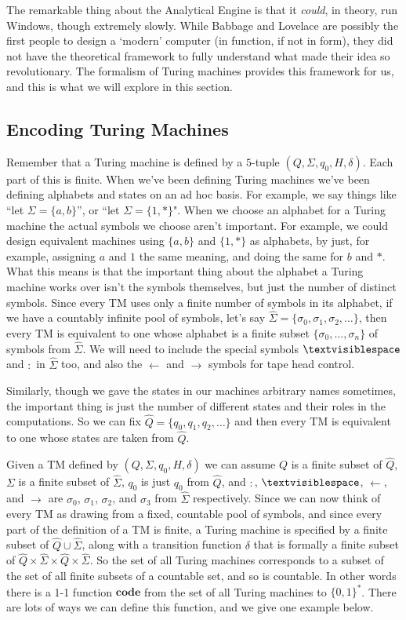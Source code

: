 \documentclass{article}
\theoremstyle{plain}
\theoremstyle{definition}
\newcommand{\tvs}{\textvisiblespace}
\newcommand{\ra}{\rightarrow}
\newcommand{\la}{\leftarrow}
\newcommand{\co}{\mathbf{code}}
\begin{document}
The remarkable thing about the Analytical Engine is that it \emph{could}, in theory, run Windows, though extremely slowly. While Babbage and Lovelace are possibly the first people to design a `modern' computer (in function, if not in form), they did not have the theoretical framework to fully understand what made their idea so revolutionary. The formalism of Turing machines provides this framework for us, and this is what we will explore in this section.  



\subsection{Encoding Turing Machines}
Remember that a Turing machine is defined by a $5$-tuple $(Q,\Sigma,q_0,H,\delta)$. Each part of this is finite. When we've been defining Turing machines we've been defining alphabets and states on an ad hoc basis. For example, we say things like ``let $\Sigma=\{a,b\}$'', or ``let $\Sigma=\{1,*\}$". When we choose an alphabet for a Turing machine the actual symbols we choose aren't important. For example, we could design equivalent machines using $\{a,b\}$ and $\{1,*\}$ as alphabets, by just, for example, assigning $a$ and $1$ the same meaning, and doing the same for $b$ and $*$. What this means is that the important thing about the alphabet a Turing machine works over isn't the symbols themselves, but just the number of distinct symbols. Since every TM uses only a finite number of symbols in its alphabet, if we have a countably infinite pool of symbols, let's say $\hat{\Sigma}=\{\sigma_0,\sigma_1,\sigma_2,\ldots\}$, then every TM is equivalent to one whose alphabet is a finite subset $\{\sigma_0,\ldots,\sigma_n\}$ of symbols from $\hat{\Sigma}$. We will need to include the special symbols $\tvs$ and $:$ in $\hat{\Sigma}$ too, and also the $\la$ and $\ra$ symbols for tape head control.

Similarly, though we gave the states in our machines arbitrary names sometimes, the important thing is just the number of different states and their roles in the computations. So we can fix $\hat{Q}=\{q_0,q_1,q_2,\ldots\}$ and then every TM is equivalent to one whose states are taken from $\hat{Q}$. 

Given a TM defined by $(Q,\Sigma,q_0,H,\delta)$ we can assume $Q$ is a finite subset of $\hat{Q}$, $\Sigma$ is a finite subset of $\hat{\Sigma}$, $q_0$ is just $q_0$ from $\hat{Q}$, and $:$, $\tvs$, $\la$, and $\ra$ are $\sigma_0$, $\sigma_1$, $\sigma_2$, and $\sigma_3$ from $\hat{\Sigma}$ respectively. Since we can now think of every TM as drawing from a fixed, countable pool of symbols, and since every part of the definition of a TM is finite, a Turing machine is specified by a finite subset of $\hat{Q}\cup\hat{\Sigma}$, along with a transition function $\delta$ that is formally a finite subset of $\hat{Q}\times\hat{\Sigma}\times\hat{Q}\times\hat{\Sigma}$. So the set of all Turing machines corresponds to a subset of the set of all finite subsets of a countable set, and so is countable. In other words there is a 1-1 function $\co$  from the set of all Turing machines to $\{0,1\}^*$. There are lots of ways we can define this function, and we give one example below.
\end{document}
